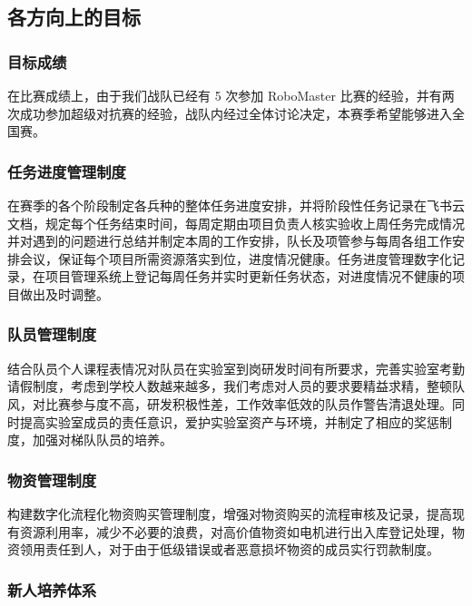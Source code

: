 \subsection{各方向上的目标}

    \subsubsection{目标成绩}

        在比赛成绩上，由于我们战队已经有 5 次参加 RoboMaster 比赛的经验，并有两次成功参加超级对抗赛的经验，战队内经过全体讨论决定，本赛季希望能够进入全国赛。\par

    \subsubsection{任务进度管理制度}

        在赛季的各个阶段制定各兵种的整体任务进度安排，并将阶段性任务记录在飞书云文档，规定每个任务结束时间，每周定期由项目负责人核实验收上周任务完成情况并对遇到的问题进行总结并制定本周的工作安排，队长及项管参与每周各组工作安排会议，保证每个项目所需资源落实到位，进度情况健康。任务进度管理数字化记录，在项目管理系统上登记每周任务并实时更新任务状态，对进度情况不健康的项目做出及时调整。\par

    \subsubsection{队员管理制度}

        结合队员个人课程表情况对队员在实验室到岗研发时间有所要求，完善实验室考勤请假制度，考虑到学校人数越来越多，我们考虑对人员的要求要精益求精，整顿队风，对比赛参与度不高，研发积极性差，工作效率低效的队员作警告清退处理。同时提高实验室成员的责任意识，爱护实验室资产与环境，并制定了相应的奖惩制度，加强对梯队队员的培养。\par

    \subsubsection{物资管理制度}

        构建数字化流程化物资购买管理制度，增强对物资购买的流程审核及记录，提高现有资源利用率，减少不必要的浪费，对高价值物资如电机进行出入库登记处理，物资领用责任到人，对于由于低级错误或者恶意损坏物资的成员实行罚款制度。\par

    \subsubsection{新人培养体系}


